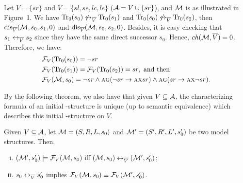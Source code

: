 \documentclass[letterpaper]{article} %
\begin{document}
\begin{example}
Let $V=\{sr\}$ and $\overline V=\{sl,se,lc,le\}$ (${\cal A} = V\cup \{sr\}$), and ${\cal M}$ is as illustrated in Figure~1.  We have $\textrm{Tr}_0(s_0) \not \leftrightarrow_{\overline V} \textrm{Tr}_0(s_1)$ and $\textrm{Tr}_0(s_0) \not \leftrightarrow_{\overline V} \textrm{Tr}_0(s_2)$, then $\textrm{dis}_{\overline V}({\cal M}, s_0, s_1, 0)$ and $\textrm{dis}_{\overline V}({\cal M}, s_0, s_2, 0)$.
Besides, it is easy checking that $s_1 \leftrightarrow_{\overline V} s_2$ since they have the same direct successor $s_0$.
Hence, $ch({\cal M}, \overline V) = 0$.
Therefore, we have:
\begin{align*}
& {\cal F}_V(\textrm{Tr}_0(s_0))= \neg sr \\
& {\cal F}_V(\textrm{Tr}_0(s_1)) = {\cal F}_V(\textrm{Tr}_0(s_2)) = sr, \text{ and then }\\
& {\cal F}_V ({\cal M}, s_0)= \neg sr \wedge \textsc{a}\textsc{g}(\neg sr \rightarrow  \textsc{a} \textsc{x} sr)\wedge \textsc{a}\textsc{g}(sr \rightarrow  \textsc{a} \textsc{x} \neg sr).
\end{align*}

\end{example}

By the following theorem, we also have that given  $V\subseteq {\cal A}$, the characterizing formula of an initial \MPK-structure is unique (up to semantic equivalence) which describes this initial \MPK-structure on $V$.
\begin{theorem}\label{CF}
Given $V\subseteq {\cal A}$, let ${\cal M}=(S,R,L,s_0)$  and ${\cal M}'=(S',R', L',s_0')$ be two model structures. Then,
\begin{enumerate}[(i)]
 \item $({\cal M}',s_0') \models {\cal F}_V({\cal M},s_0)
\text{ iff }
({\cal M},s_0) \leftrightarrow_{\overline V} ({\cal M}',s_0')$;

\item $s_0 \leftrightarrow_{\overline V} s_0'$ implies  ${\cal F}_V({\cal M}, s_0) \equiv {\cal F}_V({\cal M}', s_0')$.
\end{enumerate}

\end{theorem}
\end{document}
